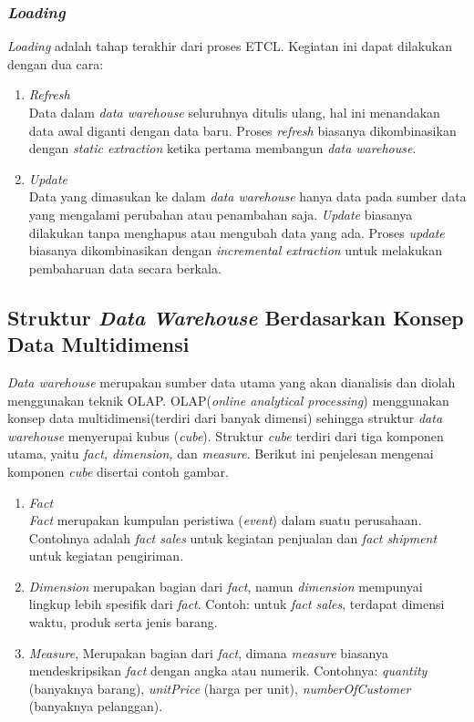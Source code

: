 \subsubsection{\textit{Loading}}
\textit{Loading} adalah tahap terakhir dari proses ETCL. Kegiatan ini dapat dilakukan dengan dua cara\cite{Matteo:2009}:
\begin{enumerate}
	\item \textit{Refresh}\\
	Data dalam \textit{data warehouse} seluruhnya ditulis ulang, hal ini menandakan data awal diganti dengan data baru. Proses \textit{refresh} biasanya dikombinasikan dengan \textit{static extraction} ketika pertama membangun \textit{data warehouse}.
	\item \textit{Update}\\
	Data yang dimasukan ke dalam \textit{data warehouse} hanya data pada sumber data yang mengalami perubahan atau penambahan saja. \textit{Update} biasanya dilakukan tanpa menghapus atau mengubah data yang ada. Proses \textit{update} biasanya dikombinasikan dengan \textit{incremental extraction} untuk melakukan pembaharuan data secara berkala.
\end{enumerate}

\subsection{Struktur \textit{Data Warehouse } Berdasarkan Konsep Data Multidimensi}

\textit{Data warehouse} merupakan sumber data utama yang akan dianalisis dan diolah menggunakan teknik OLAP. OLAP(\textit{online analytical processing}) menggunakan konsep data multidimensi(terdiri dari banyak dimensi) sehingga struktur \textit{data warehouse} menyerupai kubus (\textit{cube}). Struktur \textit{cube} terdiri dari tiga komponen utama, yaitu \textit{fact, dimension, }dan \textit{measure}. Berikut ini penjelesan mengenai komponen \textit{cube} disertai contoh gambar.\cite{Matteo:2009}

\begin{enumerate}
	\item \textit{Fact}\\
	\textit{Fact} merupakan kumpulan peristiwa (\textit{event}) dalam suatu perusahaan. Contohnya adalah \textit{fact sales} untuk kegiatan penjualan dan \textit{fact shipment} untuk kegiatan pengiriman.
	\item \textit{Dimension} merupakan bagian dari \textit{fact}, namun \textit{dimension} mempunyai lingkup lebih spesifik dari \textit{fact}. Contoh: untuk \textit{fact sales}, terdapat dimensi waktu, produk serta jenis barang.
	\item \textit{Measure}, Merupakan bagian dari \textit{fact}, dimana \textit{measure} biasanya mendeskripsikan \textit{fact} dengan angka atau numerik. Contohnya: \textit{quantity} (banyaknya barang), \textit{unitPrice} (harga per unit), \textit{numberOfCustomer} (banyaknya pelanggan).
\end{enumerate} 

